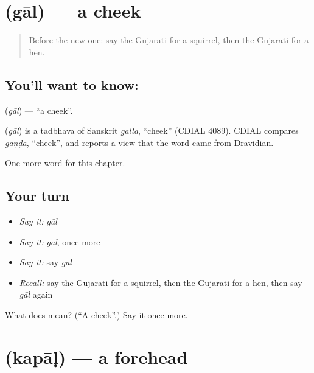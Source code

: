 \section[\texorpdfstring{\gu{ગાલ} (gāl)}{ગાલ (gāl)}]{ (gāl) — a cheek}

\label{lesson:GU-C124-gal}



\begin{quote}
Before the new one: say the Gujarati for a squirrel, then the Gujarati for a hen.
\end{quote}

\subsection*{You'll want to know: }
\textbf{} (\emph{gāl}) — \textquotedblleft{}a cheek\textquotedblright{}.

\begin{cousinweb}
\textbf{} (\emph{gāl}) is a tadbhava of Sanskrit \emph{galla}, \textquotedblleft{}cheek\textquotedblright{} (CDIAL 4089). CDIAL compares \emph{gaṇḍa}, \textquotedblleft{}cheek\textquotedblright{}, and reports a view that the word came from Dravidian.
\end{cousinweb}

\begin{grammarlens}[title={What you've built}]
One more word for this chapter.
\end{grammarlens}

\subsection*{Your turn}
\begin{itemize}
\raggedright
  \item \emph{Say it:} \emph{gāl}
  \item \emph{Say it:} \emph{gāl}, once more
  \item \emph{Say it:} say \emph{gāl}
  \item \emph{Recall:} say the Gujarati for a squirrel, then the Gujarati for a hen, then say \emph{gāl} again
\end{itemize}

\begin{tcolorbox}[breakable,colback=teal!4,colframe=teal!35!black,title={Before you move on}]
What does  mean? (\textquotedblleft{}A cheek\textquotedblright{}.) Say it once more.
\end{tcolorbox}
\section[\texorpdfstring{\gu{કપાળ} (kapāḷ)}{કપાળ (kapāḷ)}]{ (kapāḷ) — a forehead}

